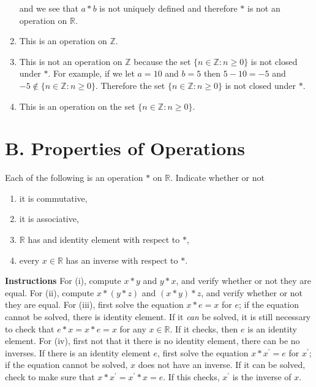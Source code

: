 \documentclass[12pt]{article}
\begin{document}
\begin{enumerate}
            and we see that $a * b$ is not uniquely defined and therefore $*$ is not an operation on $\mathbb{R}$.
          \item This is an operation on $\mathbb{Z}$.
          \item This is not an operation on $\mathbb{Z}$ because the set $\{ n \in \mathbb{Z}:n \geq 0 \}$ is not 
            closed under $*$. For example, if we let $a = 10$ and $b = 5$ then $5-10=-5$ and 
            $-5 \notin \{ n \in \mathbb{Z}:n \geq 0 \}$. Therefore the set $\{ n \in \mathbb{Z}:n \geq 0 \}$ is not 
            closed under $*$.
          \item This is an operation on the set $\{ n \in \mathbb{Z}: n \geq 0 \}$.
        \end{enumerate}
        
\section*{B. Properties of Operations}
        Each of the following is an operation $*$ on $\mathbb{R}$. Indicate whether or not
        \renewcommand{\theenumi}{(\roman{enumi})}
        \begin{enumerate}
          \item it is commutative,
          \item it is associative,
          \item $\mathbb{R}$ has and identity element with respect to $*$,
          \item every $x \in \mathbb{R}$ has an inverse with respect to $*$.
        \end{enumerate}
        \textbf{Instructions} For (i), compute $x * y$ and $y * x$, and verify whether or not they are equal. 
        For (ii), compute $x * (y * z)$ and $(x * y) * z$, and verify whether or not they are equal. For (iii), 
        first solve the equation $x * e = x$ for $e$; if the equation cannot be solved, there is identity element. 
        If it \textit{can} be solved, it is still necessary to check that $e * x = x * e = x$ for any $x \in \mathbb{R}$. 
        If it checks, then $e$ is an identity element. For (iv), first not that it there is no identity element, there 
        can be no inverses. If there is an identity element $e$, first solve the equation $x * x^{'} = e$ for
        $x^{'}$; if the equation cannot be solved, $x$ does not have an inverse. If it can be solved, check to 
        make sure that $x * x^{'} = x^{'} * x = e$. If this checks, $x^{'}$ is the inverse of $x$.
        \renewcommand{\theenumi}{\arabic{enumi})}
\end{document}
